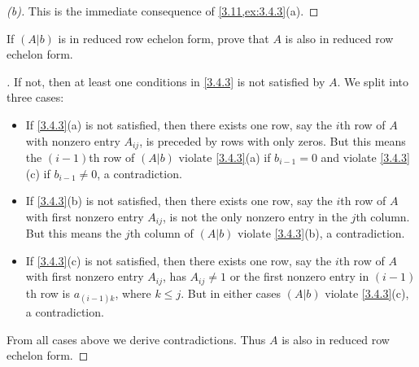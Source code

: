 \begin{proof}[(b)]
  This is the immediate consequence of \cref{3.11,ex:3.4.3}(a).
\end{proof}

\setcounter{ex}{13}
\begin{ex}\label{ex:3.4.14}
  If \((A | b)\) is in reduced row echelon form, prove that \(A\) is also in reduced row echelon form.
\end{ex}

\begin{proof}[]
  If not, then at least one conditions in \cref{3.4.3} is not satisfied by \(A\).
  We split into three cases:
  \begin{itemize}
    \item If \cref{3.4.3}(a) is not satisfied, then there exists one row, say the \(i\)th row of \(A\) with nonzero entry \(A_{i j}\), is preceded by rows with only zeros.
          But this means the \((i - 1)\)th row of \((A | b)\) violate \cref{3.4.3}(a) if \(b_{i - 1} = 0\) and violate \cref{3.4.3}(c) if \(b_{i - 1} \neq 0\), a contradiction.
    \item If \cref{3.4.3}(b) is not satisfied, then there exists one row, say the \(i\)th row of \(A\) with first nonzero entry \(A_{i j}\), is not the only nonzero entry in the \(j\)th column.
          But this means the \(j\)th column of \((A | b)\) violate \cref{3.4.3}(b), a contradiction.
    \item If \cref{3.4.3}(c) is not satisfied, then there exists one row, say the \(i\)th row of \(A\) with first nonzero entry \(A_{i j}\), has \(A_{i j} \neq 1\) or the first nonzero entry in \((i - 1)\)th row is \(a_{(i - 1) k}\), where \(k \leq j\).
          But in either cases \((A | b)\) violate \cref{3.4.3}(c), a contradiction.
  \end{itemize}
  From all cases above we derive contradictions.
  Thus \(A\) is also in reduced row echelon form.
\end{proof}
